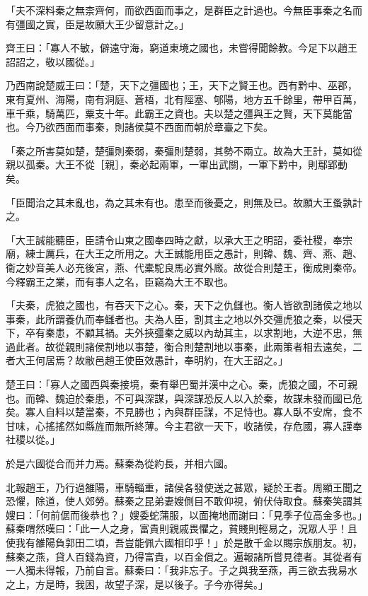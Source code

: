 \begin{pinyinscope}
「夫不深料秦之無柰齊何，而欲西面而事之，是群臣之計過也。今無臣事秦之名而有彊國之實，臣是故願大王少留意計之。」

齊王曰：「寡人不敏，僻遠守海，窮道東境之國也，未嘗得聞餘教。今足下以趙王詔詔之，敬以國從。」

乃西南說楚威王曰：「楚，天下之彊國也；王，天下之賢王也。西有黔中、巫郡，東有夏州、海陽，南有洞庭、蒼梧，北有陘塞、郇陽，地方五千餘里，帶甲百萬，車千乘，騎萬匹，粟支十年。此霸王之資也。夫以楚之彊與王之賢，天下莫能當也。今乃欲西面而事秦，則諸侯莫不西面而朝於章臺之下矣。

「秦之所害莫如楚，楚彊則秦弱，秦彊則楚弱，其勢不兩立。故為大王計，莫如從親以孤秦。大王不從［親］，秦必起兩軍，一軍出武關，一軍下黔中，則鄢郢動矣。

「臣聞治之其未亂也，為之其未有也。患至而後憂之，則無及已。故願大王蚤孰計之。

「大王誠能聽臣，臣請令山東之國奉四時之獻，以承大王之明詔，委社稷，奉宗廟，練士厲兵，在大王之所用之。大王誠能用臣之愚計，則韓、魏、齊、燕、趙、衛之妙音美人必充後宮，燕、代橐駝良馬必實外廄。故從合則楚王，衡成則秦帝。今釋霸王之業，而有事人之名，臣竊為大王不取也。

「夫秦，虎狼之國也，有吞天下之心。秦，天下之仇讎也。衡人皆欲割諸侯之地以事秦，此所謂養仇而奉讎者也。夫為人臣，割其主之地以外交彊虎狼之秦，以侵天下，卒有秦患，不顧其禍。夫外挾彊秦之威以內劫其主，以求割地，大逆不忠，無過此者。故從親則諸侯割地以事楚，衡合則楚割地以事秦，此兩策者相去遠矣，二者大王何居焉？故敝邑趙王使臣效愚計，奉明約，在大王詔之。」

楚王曰：「寡人之國西與秦接境，秦有舉巴蜀并漢中之心。秦，虎狼之國，不可親也。而韓、魏迫於秦患，不可與深謀，與深謀恐反人以入於秦，故謀未發而國已危矣。寡人自料以楚當秦，不見勝也；內與群臣謀，不足恃也。寡人臥不安席，食不甘味，心搖搖然如縣旌而無所終薄。今主君欲一天下，收諸侯，存危國，寡人謹奉社稷以從。」

於是六國從合而并力焉。蘇秦為從約長，并相六國。

北報趙王，乃行過雒陽，車騎輜重，諸侯各發使送之甚眾，疑於王者。周顯王聞之恐懼，除道，使人郊勞。蘇秦之昆弟妻嫂側目不敢仰視，俯伏侍取食。蘇秦笑謂其嫂曰：「何前倨而後恭也？」嫂委蛇蒲服，以面掩地而謝曰：「見季子位高金多也。」蘇秦喟然嘆曰：「此一人之身，富貴則親戚畏懼之，貧賤則輕易之，況眾人乎！且使我有雒陽負郭田二頃，吾豈能佩六國相印乎！」於是散千金以賜宗族朋友。初，蘇秦之燕，貸人百錢為資，乃得富貴，以百金償之。遍報諸所嘗見德者。其從者有一人獨未得報，乃前自言。蘇秦曰：「我非忘子。子之與我至燕，再三欲去我易水之上，方是時，我困，故望子深，是以後子。子今亦得矣。」


\end{pinyinscope}
